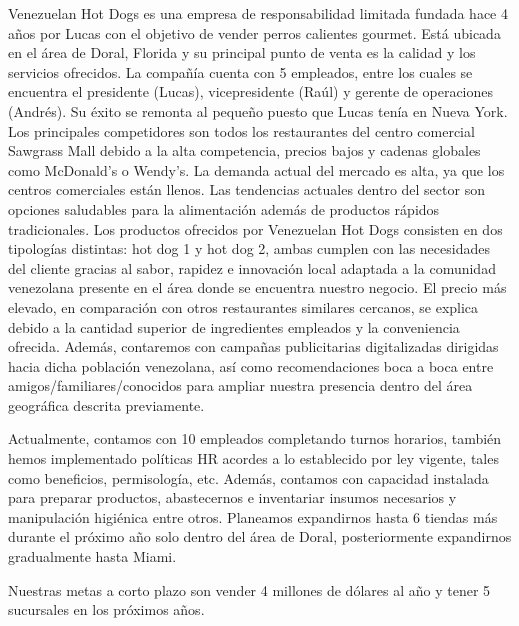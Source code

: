 Venezuelan Hot Dogs es una empresa de responsabilidad limitada fundada hace 4 años por Lucas con el objetivo de vender perros calientes gourmet. Está ubicada en el área de Doral, Florida y su principal punto de venta es la calidad y los servicios ofrecidos. La compañía cuenta con 5 empleados, entre los cuales se encuentra el presidente (Lucas), vicepresidente (Raúl) y gerente de operaciones (Andrés). Su éxito se remonta al pequeño puesto que Lucas tenía en Nueva York. Los principales competidores son todos los restaurantes del centro comercial Sawgrass Mall debido a la alta competencia, precios bajos y cadenas globales como McDonald's o Wendy's. La demanda actual del mercado es alta, ya que los centros comerciales están llenos. Las tendencias actuales dentro del sector son opciones saludables para la alimentación además de productos rápidos tradicionales.
Los productos ofrecidos por Venezuelan Hot Dogs consisten en dos tipologías distintas: hot dog 1 y hot dog 2, ambas cumplen con las necesidades del cliente gracias al sabor, rapidez e innovación local adaptada a la comunidad venezolana presente en el área donde se encuentra nuestro negocio. El precio más elevado, en comparación con otros restaurantes similares cercanos, se explica debido a la cantidad superior de ingredientes empleados y la conveniencia ofrecida. Además, contaremos con campañas publicitarias digitalizadas dirigidas hacia dicha población venezolana, así como recomendaciones boca a boca entre amigos/familiares/conocidos para ampliar nuestra presencia dentro del área geográfica descrita previamente. 

Actualmente, contamos con 10 empleados completando turnos horarios, también hemos implementado políticas HR acordes a lo establecido por ley vigente, tales como beneficios, permisología, etc. Además, contamos con capacidad instalada para preparar productos, abastecernos e inventariar insumos necesarios y manipulación higiénica entre otros. Planeamos expandirnos hasta 6 tiendas más durante el próximo año solo dentro del área de Doral, posteriormente expandirnos gradualmente hasta Miami.

Nuestras metas a corto plazo son vender 4 millones de dólares al año y tener 5 sucursales en los próximos años.
